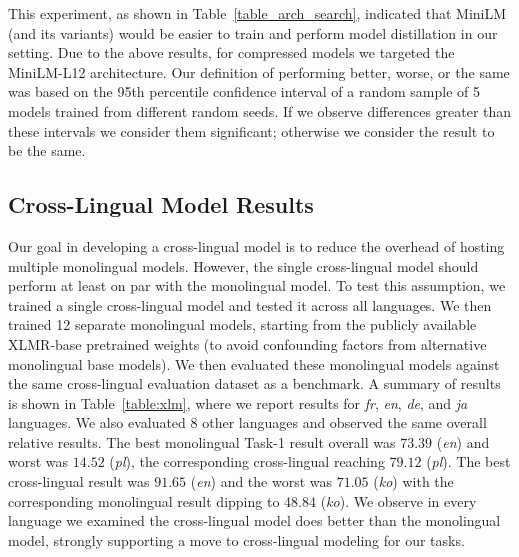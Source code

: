 This experiment, as shown in Table~\ref{table_arch_search}, indicated that MiniLM (and its variants) would be easier to train and perform model distillation in our setting.
Due to the above results, for compressed models we targeted the MiniLM-L12 architecture.
Our definition of performing better, worse, or the same was based on the 95th percentile confidence interval of a random sample of 5 models trained from different random seeds.
If we observe differences greater than these intervals we consider them significant; otherwise we consider the result to be the same.

\subsection{Cross-Lingual Model Results}
Our goal in developing a cross-lingual model is to reduce the overhead of hosting multiple monolingual models.
However, the single cross-lingual model should perform at least on par with the monolingual model.
To test this assumption, we trained a single cross-lingual model and tested it across all languages.
We then trained 12 separate monolingual models, starting from the publicly available XLMR-base pretrained weights (to avoid confounding factors from alternative monolingual base models).
We then evaluated these monolingual models against the same cross-lingual evaluation dataset as a benchmark.
A summary of results is shown in Table~\ref{table:xlm}, where we report results for \emph{fr}, \emph{en}, \emph{de}, and \emph{ja} languages. 
We also evaluated 8 other languages and observed the same overall relative results. 
The best monolingual Task-1 result overall was $73.39$ (\emph{en}) and worst was $14.52$ (\emph{pl}), the corresponding cross-lingual reaching $79.12$ (\emph{pl}). 
The best cross-lingual result was $91.65$ (\emph{en}) and the worst was $71.05$ (\emph{ko}) with the corresponding monolingual result dipping to $48.84$ (\emph{ko}).
We observe in every language we examined the cross-lingual model does better than the monolingual model, strongly supporting a move to cross-lingual modeling for our tasks.


